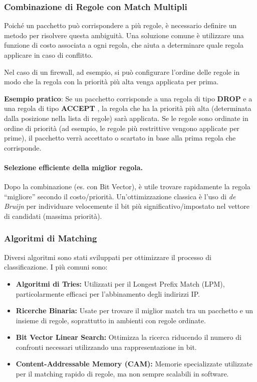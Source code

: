 \subsubsection{Combinazione di Regole con Match Multipli}
Poiché un pacchetto può corrispondere a più regole, è necessario definire un metodo per risolvere questa ambiguità. Una soluzione comune è utilizzare una funzione di costo associata a ogni regola, che aiuta a determinare quale regola applicare in caso di conflitto.

Nel caso di un firewall, ad esempio, si può configurare l'ordine delle regole in modo che la regola con la priorità più alta venga applicata per prima.

\textbf{Esempio pratico}:
Se un pacchetto corrisponde a una regola di tipo \textbf{DROP}
e a una regola di tipo \textbf{ACCEPT}
, la regola che ha la priorità più alta (determinata dalla posizione nella lista di regole) sarà applicata. Se le regole sono ordinate in ordine di priorità (ad esempio, le regole più restrittive vengono applicate per prime), il pacchetto verrà accettato o scartato in base alla prima regola che corrisponde.

\paragraph{Selezione efficiente della miglior regola.}
Dopo la combinazione (es. con Bit Vector), è utile trovare rapidamente la regola “migliore” secondo il costo/priorità. Un’ottimizzazione classica è l’uso di \emph{de Bruijn} per individuare velocemente il bit più significativo/impostato nel vettore di candidati (massima priorità).

\subsubsection{Algoritmi di Matching}
Diversi algoritmi sono stati sviluppati per ottimizzare il processo di classificazione. I più comuni sono:

\begin{itemize}
  \item \textbf{Algoritmi di Tries:} Utilizzati per il Longest Prefix Match (LPM), particolarmente efficaci per l'abbinamento degli indirizzi IP.
  \item \textbf{Ricerche Binaria:} Usate per trovare il miglior match tra un pacchetto e un insieme di regole, soprattutto in ambienti con regole ordinate.
  \item \textbf{Bit Vector Linear Search:} Ottimizza la ricerca riducendo il numero di confronti necessari utilizzando una rappresentazione in bit.
  \item \textbf{Content-Addressable Memory (CAM):} Memorie specializzate utilizzate per il matching rapido di regole, ma non sempre scalabili in software.
\end{itemize}

